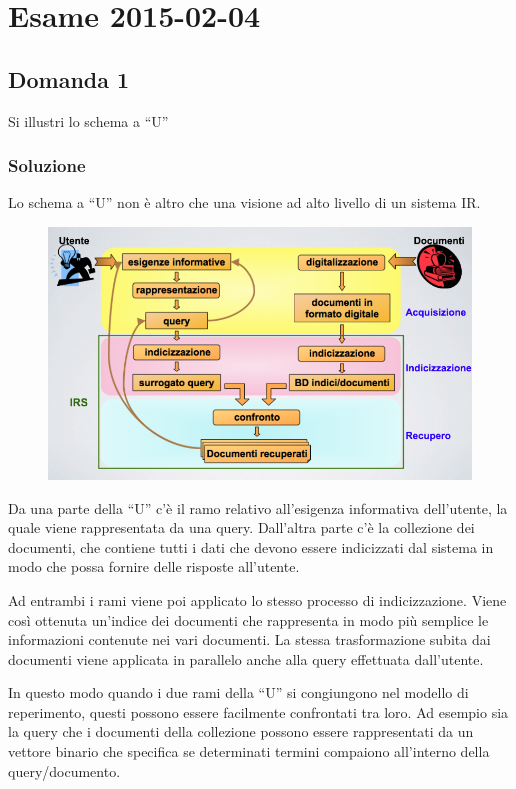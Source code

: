 
\section{Esame 2015-02-04}

\subsection{Domanda 1}

Si illustri lo schema a ``U''

\subsubsection{Soluzione}

Lo schema a ``U'' non è altro che una visione ad alto livello di un sistema IR.

\begin{figure}[htbp]
	\centering
	\includegraphics[width=.8\textwidth]{images/es-3-fig-1.png}
\end{figure}

Da una parte della ``U'' c'è il ramo relativo all'esigenza informativa dell'utente, la quale viene rappresentata da una query. Dall'altra parte c'è la collezione dei documenti, che contiene tutti i dati che devono essere indicizzati dal sistema in modo che possa fornire delle risposte all'utente.

Ad entrambi i rami viene poi applicato lo stesso processo di indicizzazione. Viene così ottenuta un'indice dei documenti che rappresenta in modo più semplice le informazioni contenute nei vari documenti. La stessa trasformazione subita dai documenti viene applicata in parallelo anche alla query effettuata dall'utente. 

In questo modo quando i due rami della ``U'' si congiungono nel modello di reperimento, questi possono essere facilmente confrontati tra loro. Ad esempio sia la query che i documenti della collezione possono essere rappresentati da un vettore binario che specifica se determinati termini compaiono all'interno della query/documento.

